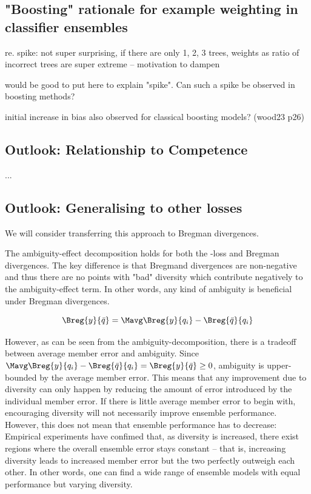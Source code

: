 \documentclass[
    a4paper, %
	fontsize=10pt, %
	twoside=false, %
]{kaobook}
\begin{document}
\subsection{"Boosting" rationale for example weighting in classifier ensembles}

re. spike: not super surprising, if there are only 1, 2, 3 trees, weights as ratio of incorrect trees are super extreme -- motivation to dampen

would be good to put here to explain "spike". Can such a spike be observed in boosting methods?

initial increase in bias also observed for classical boosting models? (wood23 p26)


\subsection{Outlook: Relationship to Competence}
...

\subsection{Outlook: Generalising to other losses}


We will consider transferring this approach to Bregman divergences.

The ambiguity-effect decomposition holds for both the \zeroone-loss and Bregman divergences. The key difference is that Bregmand divergences are non-negative and thus there are no points with "bad" diversity which contribute negatively to the ambiguity-effect term. In other words, any kind of ambiguity is beneficial under Bregman divergences.

$$
\Breg{y}{\bar{q}} = \Mavg \Breg{y}{q_{i}} - \Breg{\bar{q}}{q_{i}}
$$

However, as can be seen from the ambiguity-decomposition, there is a tradeoff between average member error and ambiguity. Since 
$ \Mavg \Breg{y}{q_{i}} - \Breg{\bar{q}}{q_{i}} = \Breg{y}{\bar{q}} \geq 0$, 
ambiguity is upper-bounded by the average member error. This means that any improvement due to diversity can only happen by reducing the amount of error introduced by the individual member error. If there is little average member error to begin with, encouraging diversity will not necessarily improve ensemble performance. However, this does not mean that ensemble performance has to decrease: Empirical experiments \cite{buschj-etc} have confimed that, as diversity is increased, there exist regions where the overall ensemble error stays constant -- that is, increasing diversity leads to increased member error but the two perfectly outweigh each other. In other words, one can find a wide range of ensemble models with equal performance but varying diversity.
\end{document}
